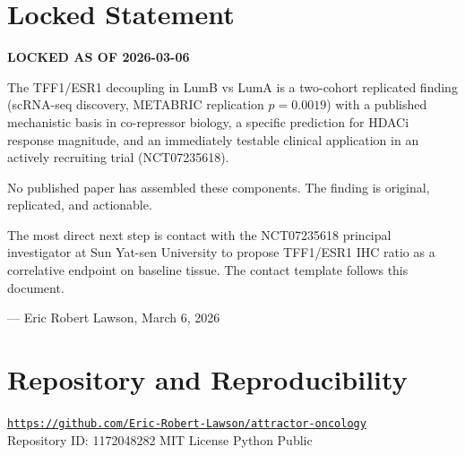 \documentclass[12pt, a4paper]{article}
\begin{document}
\section{Locked Statement}

\begin{center}
\colorbox{urgentbox}{
\begin{minipage}{0.88\textwidth}
\vspace{0.6em}
\textbf{LOCKED AS OF 2026-03-06}

\medskip
The TFF1/ESR1 decoupling in LumB vs LumA is a
two-cohort replicated finding (scRNA-seq discovery,
METABRIC replication $p=0.0019$) with a published
mechanistic basis in co-repressor biology, a specific
prediction for HDACi response magnitude, and an
immediately testable clinical application in an
actively recruiting trial (NCT07235618).

\medskip
No published paper has assembled these components.
The finding is original, replicated, and actionable.

\medskip
The most direct next step is contact with the
NCT07235618 principal investigator at Sun Yat-sen
University to propose TFF1/ESR1 IHC ratio as a
correlative endpoint on baseline tissue. The contact
template follows this document.

\medskip
\hfill --- Eric Robert Lawson, March 6, 2026
\vspace{0.4em}
\end{minipage}
}
\end{center}

\section*{Repository and Reproducibility}

\begin{center}
\href{https://github.com/Eric-Robert-Lawson/attractor-oncology}
{\texttt{https://github.com/Eric-Robert-Lawson/attractor-oncology}}\\[0.3em]
\small Repository ID: 1172048282 \textbar{}
MIT License \textbar{}
Python \textbar{}
Public
\end{center}

\end{document}
